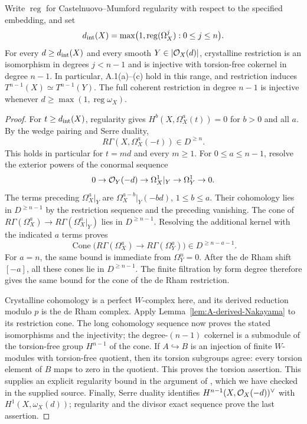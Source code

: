 \begin{theorem}\label{thm:A-high-degree}
 Write $\operatorname{reg}$
for Castelnuovo--Mumford regularity with respect to the specified
embedding, and set
\[
 d_{\rm int}(X)=\max\bigl(1,\operatorname{reg}(\Omega_X^j):0\leq j\leq n\bigr).
\]
For every $d\geq d_{\rm int}(X)$ and every smooth
$Y\in|\mathcal O_X(d)|$, crystalline restriction is an isomorphism in degrees
$j<n-1$ and is injective with torsion-free cokernel in degree $n-1$.
In particular, A.1(a)--(c) hold in this range, and restriction induces
$T^{n-1}(X)\simeq T^{n-1}(Y)$.
The full coherent restriction in degree $n-1$ is injective whenever
$d\geq\max(1,\operatorname{reg}\omega_X)$.
\end{theorem}
\begin{proof}
For $t\geq d_{\rm int}(X)$, regularity gives
$H^b(X,\Omega_X^a(t))=0$ for $b>0$ and all $a$.
By the wedge pairing and Serre duality,
\[
 R\Gamma(X,\Omega_X^a(-t))\in D^{\geq n}.
\]
This holds in particular for $t=md$ and every $m\geq1$.
For $0\leq a\leq n-1$, resolve the exterior powers of the conormal
sequence
\[
0\to\mathcal O_Y(-d)\to\Omega_X^1|_Y\to\Omega_Y^1\to0.
\]
The terms preceding $\Omega_X^a|_Y$ are
$\Omega_X^{a-b}|_Y(-bd)$, $1\leq b\leq a$.
Their cohomology lies in $D^{\geq n-1}$ by the restriction sequence and
the preceding vanishing.  The cone of
$R\Gamma(\Omega_X^a)\to R\Gamma(\Omega_X^a|_Y)$ lies in
$D^{\geq n-1}$.  Resolving the additional kernel with the indicated
$a$ terms proves
\[
\operatorname{Cone}\bigl(R\Gamma(\Omega_X^a)
 \to R\Gamma(\Omega_Y^a)\bigr)\in D^{\geq n-a-1}.
\]
For $a=n$, the same bound is immediate from $\Omega_Y^n=0$.
After the de Rham shift $[-a]$, all these cones lie in
$D^{\geq n-1}$.  The finite filtration by form degree therefore gives
the same bound for the cone of the de Rham restriction.

Crystalline cohomology is a perfect $W$-complex here, and its derived
reduction modulo $p$ is the de Rham complex.  Apply
Lemma~\ref{lem:A-derived-Nakayama} to its restriction cone.  The long
cohomology sequence now proves the stated isomorphisms and the
injectivity; the degree-$(n-1)$ cokernel is a submodule of the
torsion-free group $H^{n-1}$ of the cone.  If $A\hookrightarrow B$ is
an injection of finite $W$-modules with torsion-free quotient, then its
torsion subgroups agree: every torsion element of $B$ maps to zero in
the quotient.  This proves the torsion assertion.
This supplies an explicit regularity bound in the argument of
\citet[Lemma 2.12]{BMS2016}, which we have checked in the supplied
source.  Finally, Serre duality identifies
$H^{n-1}(X,\mathcal O_X(-d))^\vee$ with $H^1(X,\omega_X(d))$; regularity
and the divisor exact sequence prove the last assertion.
\end{proof}

